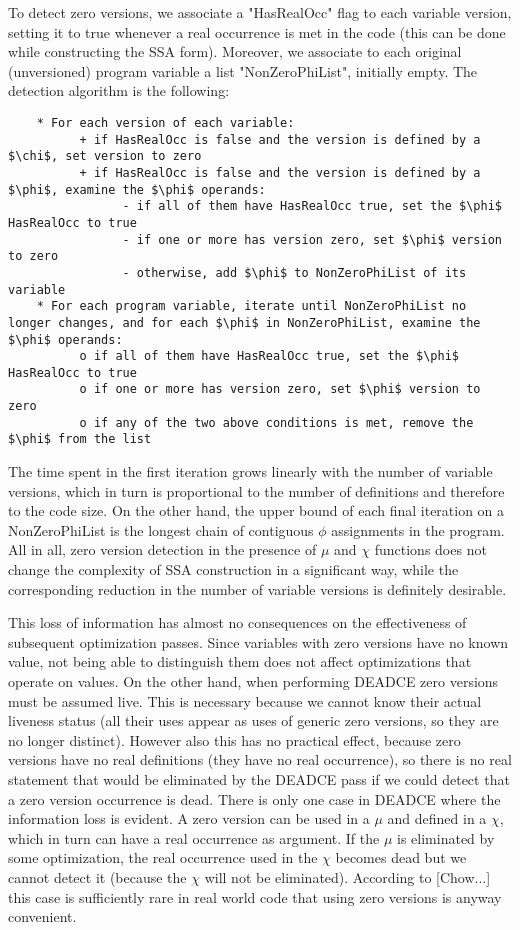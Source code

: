 To detect zero versions, we associate a "HasRealOcc" flag to each variable version, setting it to true whenever a real occurrence is met in the code (this can be done while constructing the SSA form). Moreover, we associate to each original (unversioned) program variable a list "NonZeroPhiList", initially empty.
The detection algorithm is the following:

\begin{verbatim}
    * For each version of each variable:
          + if HasRealOcc is false and the version is defined by a $\chi$, set version to zero
          + if HasRealOcc is false and the version is defined by a $\phi$, examine the $\phi$ operands:
                - if all of them have HasRealOcc true, set the $\phi$ HasRealOcc to true
                - if one or more has version zero, set $\phi$ version to zero
                - otherwise, add $\phi$ to NonZeroPhiList of its variable
    * For each program variable, iterate until NonZeroPhiList no longer changes, and for each $\phi$ in NonZeroPhiList, examine the $\phi$ operands:
          o if all of them have HasRealOcc true, set the $\phi$ HasRealOcc to true
          o if one or more has version zero, set $\phi$ version to zero
          o if any of the two above conditions is met, remove the $\phi$ from the list
\end{verbatim}

The time spent in the first iteration grows linearly with the number of variable versions, which in turn is proportional to the number of definitions and therefore to the code size.
On the other hand, the upper bound of each final iteration on a NonZeroPhiList is the longest chain of contiguous $\phi$ assignments in the program.
All in all, zero version detection in the presence of $\mu$ and $\chi$ functions does not change the complexity of SSA construction in a significant way, while the corresponding reduction in the number of variable versions is definitely desirable.

This loss of information has almost no consequences on the effectiveness of subsequent optimization passes.
Since variables with zero versions have no known value, not being able to distinguish them does not affect optimizations that operate on values.
On the other hand, when performing DEADCE zero versions must be assumed live. This is necessary because we cannot know their actual liveness status (all their uses appear as uses of generic zero versions, so they are no longer distinct). However also this has no practical effect, because zero versions have no real definitions (they have no real occurrence), so there is no real statement that would be eliminated by the DEADCE pass if we could detect that a zero version occurrence is dead.
There is only one case in DEADCE where the information loss is evident. A zero version can be used in a $\mu$ and defined in a $\chi$, which in turn can have a real occurrence as argument. If the $\mu$ is eliminated by some optimization, the real occurrence used in the $\chi$ becomes dead but we cannot detect it (because the $\chi$ will not be eliminated). According to [Chow...] this case is sufficiently rare in real world code that using zero versions is anyway convenient.


